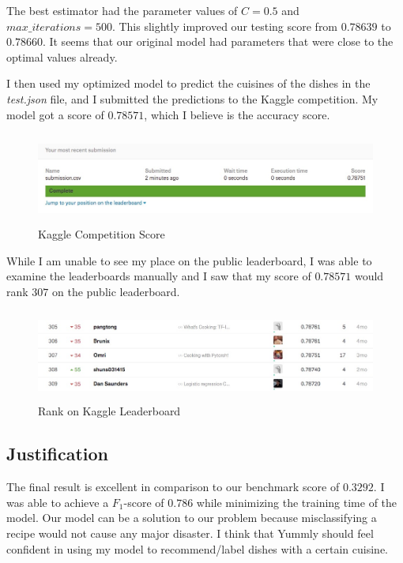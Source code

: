 \documentclass[12pt]{article}
\begin{document}
\noindent
The best estimator had the parameter values of $C=0.5$ and $max\_iterations=500$. This slightly improved our testing score from $0.78639$ to  $0.78660$. It seems that our original model had parameters that were close to the optimal values already.

I then used my optimized model to predict the cuisines of the dishes in the \textit{test.json} file, and I submitted the predictions to the Kaggle competition. My model got a score of $0.78571$, which I believe is the accuracy score. 

\begin{figure}[!h]
\includegraphics[width=15 cm, height=3cm]{kaggle-submission-rank.JPG}
\caption{Kaggle Competition Score}
\label{fig: kaggle-score}
\end{figure}

While I am unable to see my place on the public leaderboard, I was able to examine the leaderboards manually and I saw that my score of $0.78571$ would rank $307$ on the public leaderboard.

\begin{figure}[!h]
\includegraphics[width=14cm, height=3cm]{rank-comparison.JPG}
\caption{Rank on Kaggle Leaderboard}
\label{fig: kaggle-rank}
\end{figure}

\subsection{Justification}

The final result is excellent in comparison to our benchmark score of $0.3292$. I was able to achieve a $F_1$-score of $0.786$ while minimizing the training time of the model. Our model can be a solution to our problem because misclassifying a recipe would not cause any major disaster. I think that Yummly should feel confident in using my model to recommend/label dishes with a certain cuisine.
\end{document}
